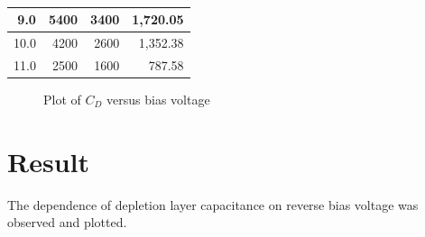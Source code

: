 \begin{table}[h]
\begin{tabular}{|r|r|r|r|}
9.0                                                                                                      & 5400                                                                                            & 3400                                                                                             & 1,720.05                                                                                        \\ \hline
10.0                                                                                                     & 4200                                                                                            & 2600                                                                                             & 1,352.38                                                                                        \\ \hline
11.0                                                                                                     & 2500                                                                                            & 1600                                                                                             & 787.58                                                                                          \\ \hline
\end{tabular}
\caption{}
\label{tab:pn}
\end{table}
%
%
\begin{figure}[H]
	\centering
	\caption{Plot of $ C_D $ versus bias voltage}
	\label{fig:1208-plot}
\end{figure}

\section{Result}
    The dependence of depletion layer capacitance on reverse bias voltage was observed and plotted.


